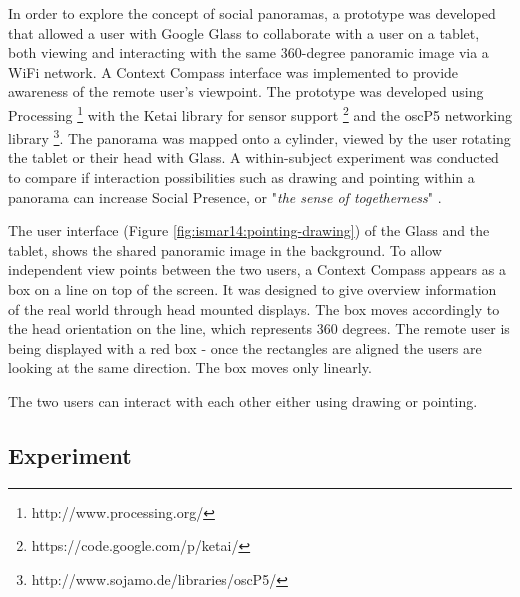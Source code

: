 In order to explore the concept of social panoramas, a prototype was developed that allowed a user with Google Glass to collaborate with a user on a tablet, both viewing and interacting with the same 360-degree panoramic image via a WiFi network. A Context Compass interface \cite{Suomela2000}  was implemented to provide awareness of the remote user's viewpoint. The prototype was developed using Processing \footnote{http://www.processing.org/} with the Ketai library for sensor support \footnote{https://code.google.com/p/ketai/} and the oscP5 networking library \footnote{http://www.sojamo.de/libraries/oscP5/}. The panorama was mapped onto a cylinder, viewed by the user rotating the tablet or their head with Glass. A within-subject experiment was conducted to compare if interaction possibilities such as drawing and pointing within a panorama can increase Social Presence, or "\textit{the sense of togetherness}" \cite{Basdogan2001}. 

The user interface (Figure \ref{fig:ismar14:pointing-drawing}) of the Glass and the tablet, shows the shared panoramic image in the background. To allow independent view points between the two users, a Context Compass appears as a box on a line on top of the screen. It was designed to give overview information of the real world through head mounted displays. The box moves accordingly to the head orientation on the line, which represents 360 degrees. The remote user is being displayed with a red box - once the rectangles are aligned the users are looking at the same direction. The box moves only linearly.

The two users can interact with each other either using drawing or pointing. 



\subsection{Experiment}

